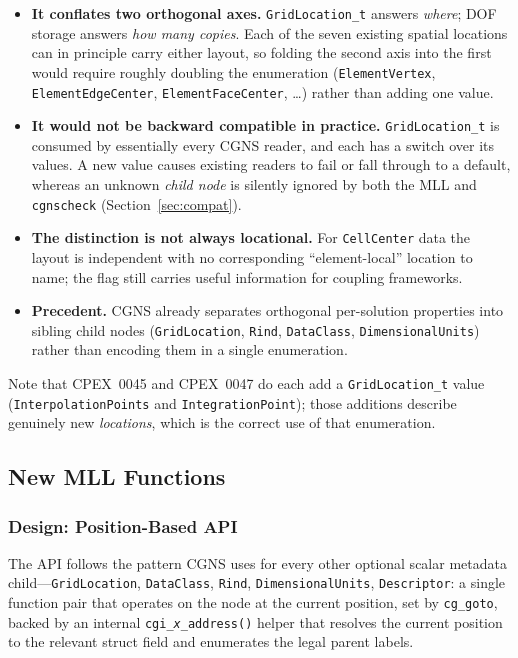 \documentclass[11pt,letterpaper]{article}
\begin{document}
\begin{itemize}[leftmargin=2em]
\item \textbf{It conflates two orthogonal axes.}  \texttt{GridLocation\_t}
  answers \emph{where}; DOF storage answers \emph{how many copies}.  Each
  of the seven existing spatial locations can in principle carry either
  layout, so folding the second axis into the first would require
  roughly doubling the enumeration (\texttt{ElementVertex},
  \texttt{ElementEdgeCenter}, \texttt{ElementFaceCenter}, \dots) rather
  than adding one value.

\item \textbf{It would not be backward compatible in practice.}
  \texttt{GridLocation\_t} is consumed by essentially every CGNS reader,
  and each has a switch over its values.  A new value causes existing
  readers to fail or fall through to a default, whereas an unknown
  \emph{child node} is silently ignored by both the MLL and
  \texttt{cgnscheck} (Section~\ref{sec:compat}).

\item \textbf{The distinction is not always locational.}  For
  \texttt{CellCenter} data the layout is independent with no
  corresponding ``element-local'' location to name; the flag still
  carries useful information for coupling frameworks.

\item \textbf{Precedent.}  CGNS already separates orthogonal per-solution
  properties into sibling child nodes (\texttt{GridLocation},
  \texttt{Rind}, \texttt{DataClass}, \texttt{DimensionalUnits}) rather
  than encoding them in a single enumeration.
\end{itemize}

Note that CPEX~0045 and CPEX~0047 do each add a
\texttt{GridLocation\_t} value (\texttt{InterpolationPoints} and
\texttt{IntegrationPoint}); those additions describe genuinely new
\emph{locations}, which is the correct use of that enumeration.

\subsection{New MLL Functions}
\label{sec:mll}

\subsubsection{Design: Position-Based API}

The API follows the pattern CGNS uses for every other optional scalar
metadata child---\texttt{GridLocation}, \texttt{DataClass},
\texttt{Rind}, \texttt{DimensionalUnits}, \texttt{Descriptor}: a single
function pair that operates on the node at the current position, set by
\texttt{cg\_goto}, backed by an internal
\texttt{cgi\_\textit{x}\_address()} helper that resolves the current
position to the relevant struct field and enumerates the legal parent
labels.
\end{document}
